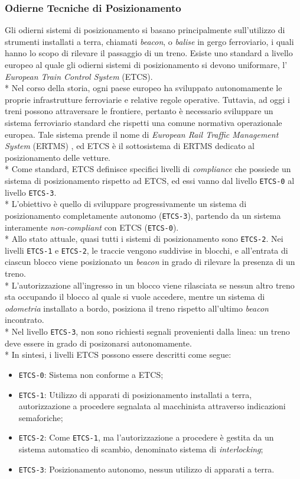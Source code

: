 \subsubsection{Odierne Tecniche di Posizionamento}
Gli odierni sistemi di posizionamento si basano principalmente sull'utilizzo di strumenti installati a terra, chiamati \emph{beacon}, o \emph{balise} in gergo ferroviario, i quali hanno lo scopo di rilevare il passaggio di un treno.\cite{tecnicheodierne}
Esiste uno standard a livello europeo al quale gli odierni sistemi di posizionamento si devono uniformare, l' \emph{European Train Control System} (ETCS).\\*
Nel corso della storia, ogni paese europeo ha sviluppato autonomamente le proprie infrastrutture ferroviarie e relative regole operative. Tuttavia, ad oggi i treni possono attraversare le frontiere, pertanto \`e necessario sviluppare un sistema ferroviario standard che rispetti una comune normativa operazionale europea. Tale sistema prende il nome di \emph{European Rail Traffic Management System} (ERTMS) \cite{ertms}, ed ETCS \`e il sottosistema di ERTMS dedicato al posizionamento delle vetture.\\*
Come standard, ETCS definisce specifici livelli di \emph{compliance} che possiede un sistema di posizionamento rispetto ad ETCS, ed essi vanno dal livello \texttt{ETCS-0} al livello \texttt{ETCS-3}.\\*
L'obiettivo \`e quello di sviluppare progressivamente un sistema di posizionamento completamente autonomo (\texttt{ETCS-3}), partendo da un sistema interamente \emph{non-compliant} con ETCS (\texttt{ETCS-0}).
\\*
Allo stato attuale, quasi tutti i sistemi di posizionamento sono \texttt{ETCS-2}. Nei livelli \texttt{ETCS-1} e \texttt{ETCS-2}, le traccie vengono suddivise in blocchi, e all'entrata di ciascun blocco viene posizionato un \emph{beacon} in grado di rilevare la presenza di un treno.\\*
L'autorizzazione all'ingresso in un blocco viene rilasciata se nessun altro treno sta occupando il blocco al quale si vuole accedere, mentre un sistema di \emph{odometria} installato a bordo, posiziona il treno rispetto all'ultimo \emph{beacon} incontrato.\\*
Nel livello \texttt{ETCS-3}, non sono richiesti segnali provenienti dalla linea: un treno deve essere in grado di posizonarsi autonomamente. \cite{etcs3}\\*
In sintesi, i livelli ETCS possono essere descritti come segue:
\begin{itemize}
	\item \texttt{ETCS-0}: Sistema non conforme a ETCS;
	\item \texttt{ETCS-1}: Utilizzo di apparati di posizionamento installati a terra, autorizzazione a procedere segnalata al macchinista attraverso indicazioni semaforiche;
	\item \texttt{ETCS-2}: Come \texttt{ETCS-1}, ma l'autorizzazione a procedere \`e gestita da un sistema automatico di scambio, denominato sistema di \emph{interlocking};\cite{interlocking}
	\item \texttt{ETCS-3}: Posizionamento autonomo, nessun utilizzo di apparati a terra.
\end{itemize}
